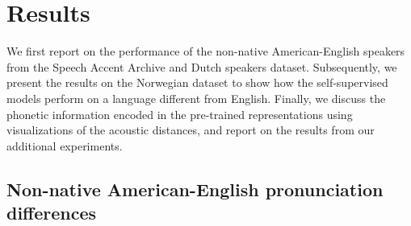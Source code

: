 \documentclass[11pt,a4paper]{article}
\begin{document}
\section{Results}
We first report on the performance of the non-native American-English speakers from the Speech Accent Archive and Dutch speakers dataset.
Subsequently, we present the results on the Norwegian dataset to show how the self-supervised models perform on a language different from English.
Finally, we discuss the phonetic information encoded in the pre-trained representations using visualizations of the acoustic distances, and report on the results from our additional experiments.




\subsection{Non-native American-English pronunciation differences}
\end{document}
